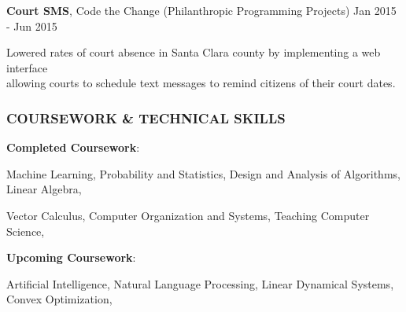 \documentclass[11pt,letterpaper]{article}%
\begin{document}
\vspace{-.3em}
\hspace{.6em}  
{\bf Court SMS}, Code the Change (Philanthropic Programming Projects) \hfill Jan 2015 - Jun 2015
\vspace{-.6em}
\begin{itemize*}
\item Lowered rates of court absence in Santa Clara county by implementing a web interface \\allowing courts to schedule text messages to remind citizens of their court dates.
\end{itemize*}


\vspace{-1em}
\hrulefill 
\subsubsection*{COURSEWORK \& TECHNICAL SKILLS}
\vspace{-1ex}
\hrulefill

\hspace{.6em} 
{\bf Completed Coursework}: 

\hspace{2.4em}
Machine Learning,
Probability and Statistics, 
Design and Analysis of Algorithms, 
Linear Algebra,

\hspace{2.4em}
Vector Calculus,
Computer Organization and Systems, 
Teaching Computer Science,

\hspace{.6em}
{\bf Upcoming Coursework}:

\hspace{2.4em}
Artificial Intelligence, 
Natural Language Processing,
Linear Dynamical Systems,
Convex Optimization,
\end{document}
